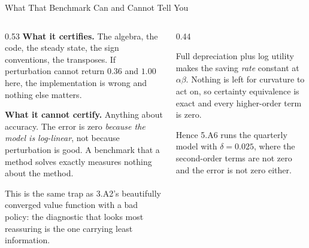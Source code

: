 \begin{frame}{What That Benchmark Can and Cannot Tell You}
\begin{columns}[T]
\begin{column}{0.53\textwidth}
\small
\textbf{What it certifies.} The algebra, the code, the steady state, the sign conventions, the transposes. If perturbation cannot return $0.36$ and $1.00$ here, the implementation is wrong and nothing else matters.
\medskip

\textbf{What it cannot certify.} Anything about accuracy. The error is zero \emph{because the model is log-linear}, not because perturbation is good. A benchmark that a method solves exactly measures nothing about the method.
\medskip

This is the same trap as 3.A2's beautifully converged value function with a bad policy: the diagnostic that looks most reassuring is the one carrying least information.
\end{column}
\begin{column}{0.44\textwidth}
\begin{cautionbox}[title=\textbf{Why $\delta=1$ does this}]\small
Full depreciation plus log utility makes the saving \emph{rate} constant at $\alpha\beta$. Nothing is left for curvature to act on, so certainty equivalence is exact and every higher-order term is zero.
\end{cautionbox}
\medskip
\begin{examplebox}\footnotesize
Hence 5.A6 runs the quarterly model with $\delta=0.025$, where the second-order terms are not zero and the error is not zero either.
\end{examplebox}
\end{column}
\end{columns}
\vspace{1mm}
\end{frame}

